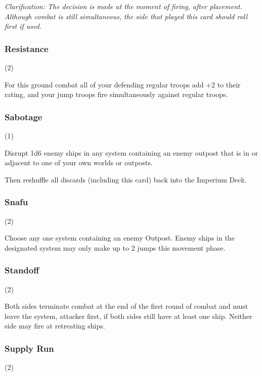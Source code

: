 \textit{Clarification: The decision is made at the moment of firing, after placement. Although combat is still simultaneous, the side that played this card should roll first if used.}

\subsubsection{Resistance} (2)


For this ground combat all of your defending regular troops add +2 to their rating, and your jump troops fire simultaneously against regular troops.

\subsubsection{Sabotage} (1)


Disrupt 1d6 enemy ships in any system containing an enemy outpost that is in or adjacent to one of your own worlds or outposts.

Then reshuffle all discards (including this card) back into the Imperium Deck.

\subsubsection{Snafu} (2)


Choose any one system containing an enemy Outpost. Enemy ships in the designated system may only make up to 2 jumps this movement phase.

\subsubsection{Standoff} (2)


Both sides terminate combat at the end of the first round of combat and must leave the system, attacker first, if both sides still have at least one ship. Neither side may fire at retreating ships.

\subsubsection{Supply Run} (2)


